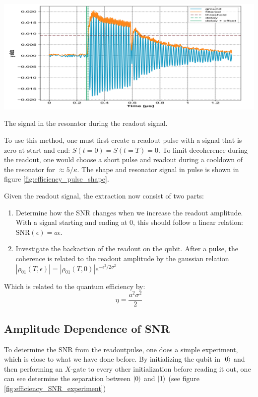 \begin{marginfigure}
    \centering
    \includegraphics{Figs/calibrations/efficiency/pulse_shape.png}
    \caption{The signal in the resonator during the readout signal.}
    \label{fig:efficiency_pulse_shape}
\end{marginfigure}

To use this method, one must first create a readout pulse with a signal that is zero at start and end: $S(t = 0) = S(t = T) = 0$. To limit decoherence during the readout, one would choose a short pulse and readout during a cooldown of the resonator for $\approx 5 / \kappa$. The shape and resonator signal in pulse is shown in figure \ref{fig:efficiency_pulse_shape}. 

Given the readout signal, the extraction now consist of two parts:
\begin{enumerate}
    \item Determine how the SNR changes when we increase the readout amplitude. With a signal starting and ending at 0, this should follow a linear relation: $\text{SNR}(\epsilon) = a \epsilon$.
    \item Investigate the backaction of the readout on the qubit. After a pulse, the coherence is related to the readout amplitude by the gaussian relation $|\rho_{01}(T, \epsilon)| = |\rho_{01}(T, 0)|e^{-\epsilon^2/2\sigma^2}$
\end{enumerate}

Which is related to the quantum efficiency by\cite{boltink}:
\begin{equation}
    \eta = \frac{a^2\sigma^2}{2}
\end{equation}

\subsection{Amplitude Dependence of SNR}
To determine the SNR from the readoutpulse, one does a simple experiment, which is close to what we have done before.  By initializing the qubit in $\ket{0}$ and then performing an $X$-gate to every other initialization before reading it out, one can see determine the separation between $\ket{0}$ and $\ket{1}$ (see figure \ref{fig:efficiency_SNR_experiment})

